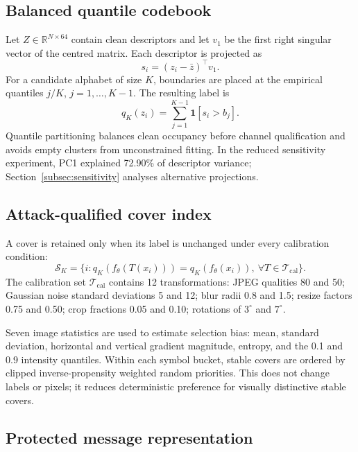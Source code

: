 \documentclass[10pt,journal]{IEEEtran}
\begin{document}
\subsection{Balanced quantile codebook}

Let $Z\in\mathbb{R}^{N\times64}$ contain clean descriptors and let
$v_1$ be the first right singular vector of the centred matrix. Each
descriptor is projected as
\begin{equation}
s_i=(z_i-\bar z)^\top v_1.
\end{equation}
For a candidate alphabet of size $K$, boundaries are placed at the
empirical quantiles $j/K$, $j=1,\ldots,K-1$. The resulting label is
\begin{equation}
q_K(z_i)=\sum_{j=1}^{K-1}\mathbf{1}[s_i>b_j].
\label{eq:quantile}
\end{equation}
Quantile partitioning balances clean occupancy before channel
qualification and avoids empty clusters from unconstrained fitting.
In the reduced sensitivity experiment, PC1 explained 72.90\% of
descriptor variance; Section~\ref{subsec:sensitivity} analyses
alternative projections.

\subsection{Attack-qualified cover index}

A cover is retained only when its label is unchanged under every
calibration condition:
\begin{equation}
\mathcal{S}_K=
\bigl\{i:q_K(f_\theta(T(x_i)))=q_K(f_\theta(x_i)),
\ \forall T\in\mathcal{T}_{\mathrm{cal}}\bigr\}.
\label{eq:stable}
\end{equation}
The calibration set $\mathcal{T}_{\mathrm{cal}}$ contains 12
transformations: JPEG qualities 80 and 50; Gaussian noise standard
deviations 5 and 12; blur radii 0.8 and 1.5; resize factors 0.75
and 0.50; crop fractions 0.05 and 0.10; rotations of $3^\circ$
and $7^\circ$.

Seven image statistics are used to estimate selection bias: mean,
standard deviation, horizontal and vertical gradient magnitude,
entropy, and the 0.1 and 0.9 intensity quantiles. Within each symbol
bucket, stable covers are ordered by clipped inverse-propensity
weighted random priorities. This does not change labels or pixels; it
reduces deterministic preference for visually distinctive stable covers.

\subsection{Protected message representation}
\end{document}
